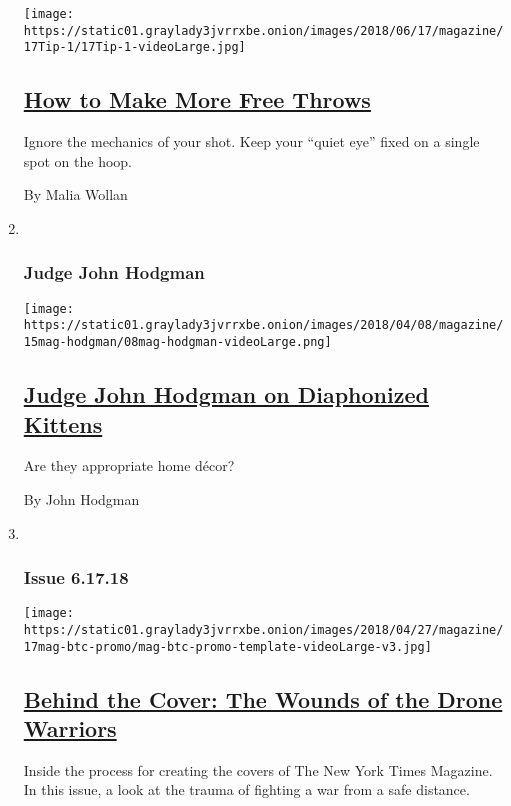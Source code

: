 \begin{enumerate}
  \texttt{[image: https://static01.graylady3jvrrxbe.onion/images/2018/06/17/magazine/17Tip-1/17Tip-1-videoLarge.jpg]}

  \hypertarget{how-to-make-more-free-throws}{%
  \subsection{\texorpdfstring{\href{/2018/06/13/magazine/how-to-make-more-free-throws.html}{How
  to Make More Free
  Throws}}{How to Make More Free Throws}}\label{how-to-make-more-free-throws}}

  Ignore the mechanics of your shot. Keep your ``quiet eye'' fixed on a
  single spot on the hoop.

  By Malia Wollan
\item ~
  \hypertarget{judge-john-hodgman}{%
  \subsubsection{Judge John Hodgman}\label{judge-john-hodgman}}

  \texttt{[image: https://static01.graylady3jvrrxbe.onion/images/2018/04/08/magazine/15mag-hodgman/08mag-hodgman-videoLarge.png]}

  \hypertarget{judge-john-hodgman-on-diaphonized-kittens}{%
  \subsection{\texorpdfstring{\href{/2018/06/13/magazine/judge-john-hodgman-on-diaphonized-kittens.html}{Judge
  John Hodgman on Diaphonized
  Kittens}}{Judge John Hodgman on Diaphonized Kittens}}\label{judge-john-hodgman-on-diaphonized-kittens}}

  Are they appropriate home décor?

  By John Hodgman
\item ~
  \hypertarget{issue-61718}{%
  \subsubsection{Issue 6.17.18}\label{issue-61718}}

  \texttt{[image: https://static01.graylady3jvrrxbe.onion/images/2018/04/27/magazine/17mag-btc-promo/mag-btc-promo-template-videoLarge-v3.jpg]}

  \hypertarget{behind-the-cover-the-wounds-of-the-drone-warriors}{%
  \subsection{\texorpdfstring{\href{/2018/06/13/magazine/behind-the-cover-the-wounds-of-the-drone-warriors.html}{Behind
  the Cover: The Wounds of the Drone
  Warriors}}{Behind the Cover: The Wounds of the Drone Warriors}}\label{behind-the-cover-the-wounds-of-the-drone-warriors}}

  Inside the process for creating the covers of The New York Times
  Magazine. In this issue, a look at the trauma of fighting a war from a
  safe distance.
\end{enumerate}

